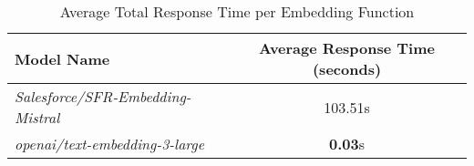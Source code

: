 
\begin{table}[H]
\centering
\begin{tabular}{@{}lc@{}}
\toprule
Model Name & Average Response Time (seconds) \\
\midrule
\textit{Salesforce/SFR-Embedding-Mistral} & 103.51s \\
\textit{openai/text-embedding-3-large} & \textbf{0.03}s \\

\bottomrule
\end{tabular}
\caption{Average Total Response Time per Embedding Function}
\label{tab:average_response_time}
\end{table}
